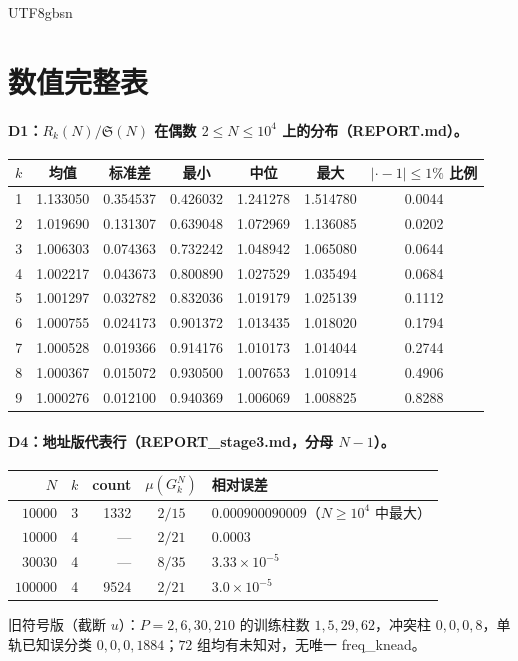 \documentclass[11pt,a4paper]{article}
\newcommand{\Haar}{\mu}
\newcommand{\Sing}{\mathfrak S}
\theoremstyle{plain}
\theoremstyle{definition}
\begin{document}
\begin{CJK}{UTF8}{gbsn}
\section{数值完整表}\label{paper:app:tables}

\paragraph{D1：$R_k(N)/\Sing(N)$ 在偶数 $2\le N\le10^4$ 上的分布（REPORT.md）。}
\begin{center}
\small
\begin{tabular}{rcccccc}
\hline
$k$ & 均值 & 标准差 & 最小 & 中位 & 最大 & $|\cdot-1|\le1\%$ 比例\\
\hline
1 & 1.133050 & 0.354537 & 0.426032 & 1.241278 & 1.514780 & 0.0044\\
2 & 1.019690 & 0.131307 & 0.639048 & 1.072969 & 1.136085 & 0.0202\\
3 & 1.006303 & 0.074363 & 0.732242 & 1.048942 & 1.065080 & 0.0644\\
4 & 1.002217 & 0.043673 & 0.800890 & 1.027529 & 1.035494 & 0.0684\\
5 & 1.001297 & 0.032782 & 0.832036 & 1.019179 & 1.025139 & 0.1112\\
6 & 1.000755 & 0.024173 & 0.901372 & 1.013435 & 1.018020 & 0.1794\\
7 & 1.000528 & 0.019366 & 0.914176 & 1.010173 & 1.014044 & 0.2744\\
8 & 1.000367 & 0.015072 & 0.930500 & 1.007653 & 1.010914 & 0.4906\\
9 & 1.000276 & 0.012100 & 0.940369 & 1.006069 & 1.008825 & 0.8288\\
\hline
\end{tabular}
\end{center}

\paragraph{D4：地址版代表行（REPORT\_stage3.md，分母 $N-1$）。}
\begin{center}
\small
\begin{tabular}{rrrcl}
\hline
$N$ & $k$ & count & $\Haar(G_k^N)$ & 相对误差\\
\hline
$10000$ & 3 & 1332 & $2/15$ & $0.000900090009$（$N\ge10^4$ 中最大）\\
$10000$ & 4 & — & $2/21$ & $0.0003$\\
$30030$ & 4 & — & $8/35$ & $3.33\times10^{-5}$\\
$100000$ & 4 & 9524 & $2/21$ & $3.0\times10^{-5}$\\
\hline
\end{tabular}
\end{center}
旧符号版（截断 $u$）：$P=2,6,30,210$ 的训练柱数 $1,5,29,62$，冲突柱 $0,0,0,8$，单轨已知误分类 $0,0,0,1884$；$72$ 组均有未知对，无唯一 freq\_knead。


\end{CJK}
\end{document}
